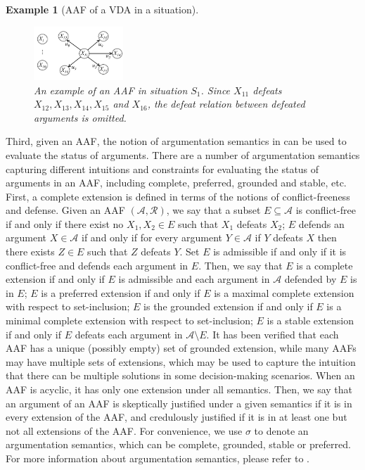 \documentclass[letterpaper]{article} %
\newtheorem{example}{Example}
\begin{document}
\begin{example}[AAF of a VDA in a situation]
\begin{figure}[h!]
  \centering
 \includegraphics[width=0.3\textwidth]{exam2.png}
  \caption{An example of an AAF in situation $S_1$. Since $X_{11}$ defeats $X_{12}, X_{13}, X_{14}, X_{15}$ and $X_{16}$, the defeat relation between defeated arguments is omitted.}
    \label{fig:ex-2}
\end{figure}
\end{example}


Third, given an AAF, 
the notion of argumentation semantics in \cite{DBLP:journals/ai/Dung95} can be used to evaluate the status of arguments. There are a number of argumentation semantics capturing different intuitions and constraints for evaluating the status of arguments in an AAF, including complete, preferred, grounded and stable, etc. First, a complete extension is defined in terms of the notions of conflict-freeness and defense. Given an AAF $(\mathcal{A}, \mathcal{R})$, we say that a subset $E\subseteq \mathcal{A}$ is conflict-free if and only if there exist no $X_1, X_2\in E$  such that $X_1$ defeats $X_2$; $E$ defends an argument $X\in \mathcal{A}$ if and only if for every argument $Y\in \mathcal{A}$ if $Y$ defeats $X$ then there exists $Z\in E$ such that $Z$ defeats $Y$. Set $E$ is admissible if and only if it is conflict-free and defends each argument in $E$. Then, we say that $E$ is a complete extension if and only if $E$ is admissible and each argument in $\mathcal{A}$ defended by $E$ is in $E$; $E$ is a preferred extension if and only if $E$ is a maximal complete extension with respect to set-inclusion; $E$ is the grounded extension if and only if $E$ is a minimal complete extension with respect to set-inclusion; $E$ is a stable extension if and only if $E$ defeats each argument in $\mathcal{A}\setminus E$. It has been verified that each AAF has a unique (possibly empty) set of grounded extension, while many AAFs may have multiple sets of extensions, which may be used to capture the intuition that there can be multiple solutions in some decision-making scenarios. When an AAF is acyclic, it has only one extension under all semantics. 
Then, we say that an argument of an AAF is skeptically justified under a given semantics if it is in every extension of the AAF, and credulously justified if it is in at least one but not all extensions of the AAF. For convenience, we use $\sigma$ to denote an argumentation semantics, which can be complete, grounded, stable or preferred. 
For more information about argumentation semantics, please refer to \cite{DBLP:journals/ker/BaroniCG11}.
\end{document}
